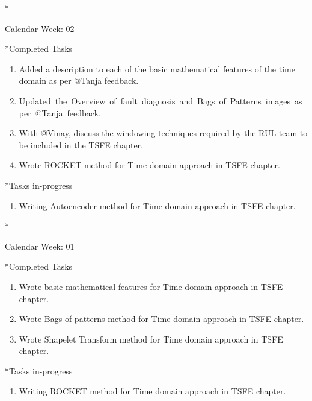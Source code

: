 \documentclass[11pt,a4paper]{article}
\begin{document}
\newpage
\begin{section}*{Calendar Week: 02 \hfill \date{15 January, 2021}}
 \begin{subsection}*{Completed Tasks}
     \begin{enumerate}
         \item
               Added a description to each of the basic mathematical features of the time domain as per @Tanja feedback.
         \item
               Updated the Overview of fault diagnosis and Bags of Patterns images as per @Tanja feedback.
         \item
               With @Vinay, discuss the windowing techniques required by the RUL team to be included in the TSFE chapter.
         \item
               Wrote ROCKET method for Time domain approach in TSFE chapter.
     \end{enumerate}
 \end{subsection}

 \begin{subsection}*{Tasks in-progress}
     \begin{enumerate}
         \item
               Writing Autoencoder method for Time domain approach in TSFE chapter.
     \end{enumerate}
 \end{subsection}
\end{section}

\newpage
\begin{section}*{Calendar Week: 01 \hfill \date{08 January, 2021}}
 \begin{subsection}*{Completed Tasks}
     \begin{enumerate}
         \item
               Wrote basic mathematical features for Time domain approach in TSFE chapter.
         \item
               Wrote Bags-of-patterns method for Time domain approach in TSFE chapter.
         \item
               Wrote Shapelet Transform method for Time domain approach in TSFE chapter.
     \end{enumerate}
 \end{subsection}

 \begin{subsection}*{Tasks in-progress}
     \begin{enumerate}
         \item
               Writing ROCKET method for Time domain approach in TSFE chapter.
     \end{enumerate}
 \end{subsection}
\end{section}
\end{document}

